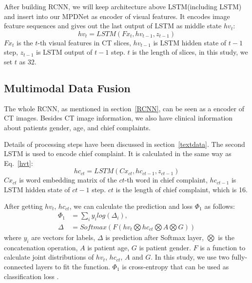 \documentclass[journal]{IEEEtran}
\begin{document}
After building RCNN, we will keep architecture above LSTM(including LSTM) and insert into our MPDNet as encoder of visual features. It encodes image feature sequences and gives out the last output of LSTM as middle state $hv_t$:
\begin{equation}
hv_t = LSTM(Fx_t, hv_{t-1}, z_{t-1})
\label{hvt}
\end{equation}
$Fx_t$ is the $t$-th visual features in CT slices, $hv_{t-1}$ is LSTM hidden state of $t-1$ step, $z_{t-1}$ is LSTM output of $t-1$ step. $t$ is the length of slices, in this study, we set $t$ as 32.


\subsection{Multimodal Data Fusion}
\label{MMDDtxt}

The whole RCNN, as mentioned in section~\ref{RCNN}, can be seen as a encoder of CT images.
Besides CT image information, we also have clinical information about patients gender, age, and chief complaints. 

Details of processing steps have been discussed in section~\ref{textdata}. The second LSTM is used to encode chief complaint. It is calculated in the same way as Eq.~\ref{hvt}:
\begin{equation}
    hc_{ct} = LSTM(Cx_{ct}, hc_{ct-1}, z_{ct-1})
    \label{hct}
\end{equation}
$Cx_{ct}$ is word embedding matrix of the $ct$-th word in chief complaint, $hc_{ct-1}$ is LSTM hidden state of $ct-1$ step. $ct$ is the length of chief complaint, which is 16. 

After getting $hv_t$, $hc_{ct}$, we can calculate the prediction and loss $\Phi_1$ as follows:
\begin{align*}\label{classifyandloss1}
    \Phi_1 &= \sum_i{y_i log(\Delta_i)}, \\
    \Delta &= Softmax(F(hv_t \bigotimes hc_{ct} \bigotimes A \bigotimes G))
\end{align*}
where $y_i$ are vectors for labels, $\Delta$ is prediction after Softmax layer, $\bigotimes$ is the concatenation operation, $A$ is patient age, $G$ is patient gender. $F$ is a function to calculate joint distributions of $hv_t$, $hc_{ct}$, $A$ and $G$. In this study, we use two fully-connected layers to fit the function. $\Phi_1$ is cross-entropy that can be used as classification loss \cite{Zreik2018A}.
\end{document}
